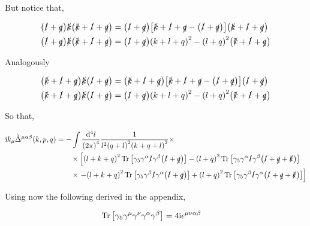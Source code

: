 But notice that,

\begin{align}
    \qty(\slashed {l}+\slashed q)\slashed k\qty(\slashed {k}+\slashed{l}+\slashed q)&=\qty(\slashed {l}+\slashed q)\qty[\slashed k+\slashed l+\slashed q-\qty(\slashed l+\slashed q)]\qty(\slashed {k}+\slashed{l}+\slashed q)\nonumber\\
    \qty(\slashed {l}+\slashed q)\slashed k\qty(\slashed {k}+\slashed{l}+\slashed q)&=
    \qty(\slashed {l}+\slashed q)\qty( k+ l+ q)^2-\qty( l+ q)^2\qty(\slashed {k}+\slashed{l}+\slashed q)\nonumber
\end{align}

Analogously

\begin{align}
    \qty(\slashed {k}+\slashed{l}+\slashed q)\slashed k\qty(\slashed {l}+\slashed q)&=\qty(\slashed {k}+\slashed{l}+\slashed q)\qty[\slashed k+\slashed l+\slashed q-\qty(\slashed l+\slashed q)]\qty(\slashed {l}+\slashed q)\nonumber\\
    \qty(\slashed {k}+\slashed{l}+\slashed q)\slashed k\qty(\slashed {l}+\slashed q)&=
    \qty(\slashed {l}+\slashed q)\qty( k+ l+ q)^2-\qty( l+ q)^2\qty(\slashed {k}+\slashed{l}+\slashed q)\nonumber
\end{align}

So that,

\begin{align}
    \textnormal{i} k_\mu{\tilde\Delta}^{\mu\alpha\beta}\qty(k,p,q)&=-
    \int\frac{\dd[4]{l}}{\qty(2\pi)^4}\frac{1}{l^2\qty(q+l)^2\qty(k+q+l)^2}\times\nonumber\\
    &\quad\quad\times\left[
    \qty(l+k+q)^2\Tr\qty[\gamma_5 \gamma^\alpha\slashed {l}\gamma^\beta \qty(\slashed l+\slashed q)]-\qty(l+q)^2\Tr\qty[\gamma_5 \gamma^\alpha\slashed {l}\gamma^\beta\qty(\slashed l+\slashed q+\slashed k)]\right.\nonumber\\
    &\quad\quad\times\left.
    -\qty(l+k+q)^2\Tr\qty[\gamma_5 \gamma^\beta\slashed {l}\gamma^\alpha\qty(\slashed l+\slashed q)]+\qty(l+q)^2\Tr\qty[\gamma_5 \gamma^\beta\slashed {l}\gamma^\alpha\qty(\slashed l+\slashed q+\slashed k)]\right]\nonumber
\end{align}

Using now the following derived in the appendix,

\begin{align}
    \Tr\qty[\gamma_5\gamma^\mu\gamma^\nu\gamma^\alpha\gamma^\beta]&=4\textnormal{i}\epsilon^{\mu\nu\alpha\beta}\nonumber
\end{align}

